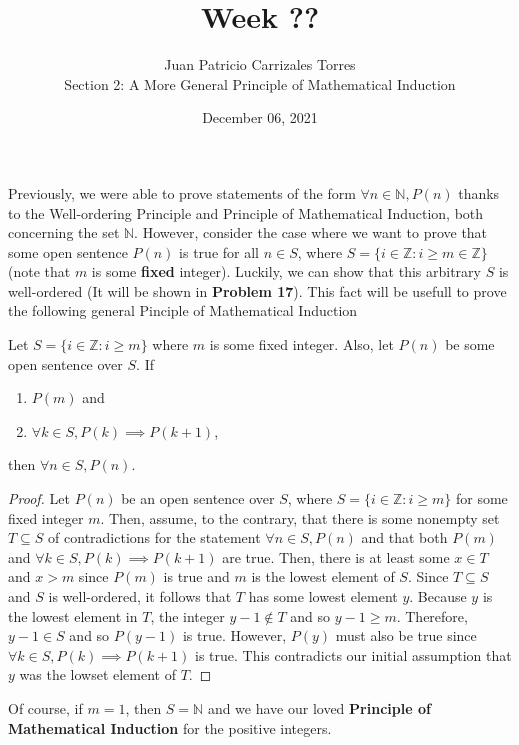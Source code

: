 \documentclass[12pt]{article}
\newcommand{\N}{\mathbb{N}}
\newcommand{\Z}{\mathbb{Z}}
\newenvironment{theorem}[2][Theorem]{\begin{trivlist}
		\item[\hskip \labelsep {\bfseries #1}\hskip \labelsep {\bfseries #2.}]}{\end{trivlist}}
\begin{document}
	
	\title{Week ??}
	\author{Juan Patricio Carrizales Torres \\
		Section 2: A More General Principle of Mathematical Induction}
	\date{December 06, 2021}
	\maketitle

Previously, we were able to prove statements of the form $\forall n\in \N, P(n)$ thanks to the Well-ordering Principle and Principle of Mathematical Induction, both concerning the set $\N$. However, consider the case where we want to prove that some open sentence $P(n)$ is true for all $n\in S$, where $S = \{i\in \Z : i\geq m\in \Z\}$ (note that $m$ is some \textbf{fixed} integer). Luckily, we can show that this arbitrary $S$ is well-ordered (It will be shown in \textbf{Problem 17}). This fact will be usefull to prove the following general Pinciple of Mathematical Induction

\begin{theorem}{1}
	Let $S = \{i\in \Z : i\geq m\}$ where $m$ is some fixed integer. Also, let $P(n)$ be some open sentence over $S$. If
		\begin{enumerate}
			\item $P(m)$ and
			\item $\forall k\in S, P(k) \implies P(k+1)$,
		\end{enumerate}
	then $\forall n\in S, P(n)$.
	
	\begin{proof}
		Let $P(n)$ be an open sentence over $S$, where $S = \{i\in \Z:i\geq m\}$ for some fixed integer $m$. Then, assume, to the contrary, that there is some nonempty set $T\subseteq S$ of contradictions for the statement $\forall n \in S, P(n)$ and that both $P(m)$ and $\forall k\in S, P(k) \implies P(k+1)$ are true. Then, there is at least some $x\in T$ and $x>m$  since $P(m)$ is true and $m$ is the lowest element of $S$. Since $T\subseteq S$ and $S$ is well-ordered, it follows that $T$ has some lowest element $y$. Because $y$ is the lowest element in $T$, the integer $y-1 \not\in T$ and so $y-1 \geq m$. Therefore, $y-1\in S$ and so $P(y-1)$ is true. However, $P(y)$ must also be true since $\forall k\in S, P(k) \implies P(k+1)$ is true. This contradicts our initial assumption that $y$ was the lowset element of $T$.
	\end{proof}
\end{theorem}

Of course, if $m = 1$, then $S = \N$ and we have our loved \textbf{Principle of Mathematical Induction} for the positive integers.
\end{document}
